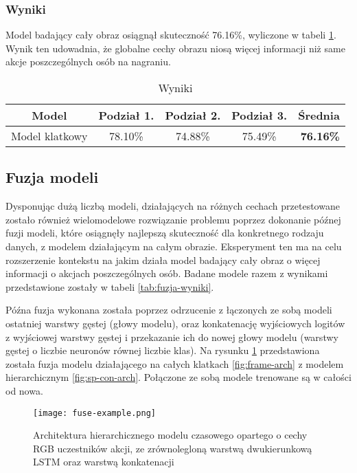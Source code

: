 \subsubsection{Wyniki}
Model badający cały obraz osiągnął skuteczność 76.16\%, wyliczone w tabeli \ref{tab:frame-rgb-wyniki}. Wynik ten udowadnia, że  globalne cechy obrazu niosą więcej informacji niż same akcje poszczególnych osób na nagraniu. 
\begin{table}[!h] \centering
\caption{Wyniki}
\begin{tabular} {| c | c | c | c | r |} \hline
    Model & Podział 1.  & Podział 2. & Podział 3. & \textbf{Średnia} \\ \hline\hline
    Model klatkowy &  78.10\%	& 74.88\%	& 75.49\%	& \textbf{76.16\%} \\ \hline
\end{tabular}
\label{tab:frame-rgb-wyniki} 
\end{table}
\subsection{Fuzja modeli} 
Dysponując dużą liczbą modeli, działających na różnych cechach przetestowane zostało również wielomodelowe rozwiązanie problemu poprzez dokonanie późnej fuzji modeli, które osiągnęły najlepszą skuteczność dla konkretnego rodzaju danych, z modelem działającym na całym obrazie. Eksperyment ten ma na celu rozszerzenie kontekstu na jakim działa model badający cały obraz o więcej informacji o akcjach poszczególnych osób. Badane modele razem z wynikami przedstawione zostały w tabeli \ref{tab:fuzja-wyniki}. 

Późna fuzja wykonana została poprzez odrzucenie z łączonych ze sobą modeli ostatniej warstwy gęstej (głowy modelu), oraz konkatenację wyjściowych logitów z wyjściowej warstwy gęstej i przekazanie ich do nowej głowy modelu (warstwy gęstej o liczbie neuronów równej liczbie klas). Na rysunku \ref{fig:fuse-example-arch} przedstawiona została fuzja modelu działającego na całych klatkach \ref{fig:frame-arch} z modelem hierarchicznym \ref{fig:sp-con-arch}. Połączone ze sobą modele trenowane są w całości od nowa. 


\begin{figure}[!h]
    \centering \texttt{[image: fuse-example.png]}
    \caption{Architektura hierarchicznego modelu czasowego opartego o cechy RGB uczestników akcji, ze zrównolegloną warstwą dwukierunkową LSTM oraz warstwą konkatenacji}
    \label{fig:fuse-example-arch}
\end{figure}


